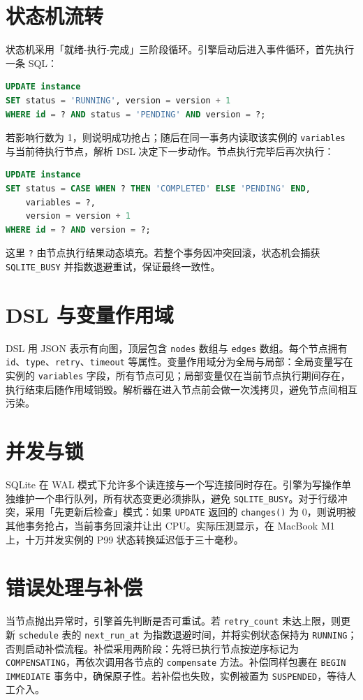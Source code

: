 \chapter{状态机流转}
状态机采用「就绪-执行-完成」三阶段循环。引擎启动后进入事件循环，首先执行一条 SQL：\par
\begin{lstlisting}[language=sql]
UPDATE instance
SET status = 'RUNNING', version = version + 1
WHERE id = ? AND status = 'PENDING' AND version = ?;
\end{lstlisting}
若影响行数为 1，则说明成功抢占；随后在同一事务内读取该实例的 \texttt{variables} 与当前待执行节点，解析 DSL 决定下一步动作。节点执行完毕后再次执行：\par
\begin{lstlisting}[language=sql]
UPDATE instance
SET status = CASE WHEN ? THEN 'COMPLETED' ELSE 'PENDING' END,
    variables = ?,
    version = version + 1
WHERE id = ? AND version = ?;
\end{lstlisting}
这里 \texttt{?} 由节点执行结果动态填充。若整个事务因冲突回滚，状态机会捕获 \texttt{SQLITE\_{}BUSY} 并指数退避重试，保证最终一致性。\par
\chapter{DSL 与变量作用域}
DSL 用 JSON 表示有向图，顶层包含 \texttt{nodes} 数组与 \texttt{edges} 数组。每个节点拥有 \texttt{id}、\texttt{type}、\texttt{retry}、\texttt{timeout} 等属性。变量作用域分为全局与局部：全局变量写在实例的 \texttt{variables} 字段，所有节点可见；局部变量仅在当前节点执行期间存在，执行结束后随作用域销毁。解析器在进入节点前会做一次浅拷贝，避免节点间相互污染。\par
\chapter{并发与锁}
SQLite 在 WAL 模式下允许多个读连接与一个写连接同时存在。引擎为写操作单独维护一个串行队列，所有状态变更必须排队，避免 \texttt{SQLITE\_{}BUSY}。对于行级冲突，采用「先更新后检查」模式：如果 \texttt{UPDATE} 返回的 \texttt{changes()} 为 0，则说明被其他事务抢占，当前事务回滚并让出 CPU。实际压测显示，在 MacBook M1 上，十万并发实例的 P99 状态转换延迟低于三十毫秒。\par
\chapter{错误处理与补偿}
当节点抛出异常时，引擎首先判断是否可重试。若 \texttt{retry\_{}count} 未达上限，则更新 \texttt{schedule} 表的 \texttt{next\_{}run\_{}at} 为指数退避时间，并将实例状态保持为 \texttt{RUNNING}；否则启动补偿流程。补偿采用两阶段：先将已执行节点按逆序标记为 \texttt{COMPENSATING}，再依次调用各节点的 \texttt{compensate} 方法。补偿同样包裹在 \texttt{BEGIN IMMEDIATE} 事务中，确保原子性。若补偿也失败，实例被置为 \texttt{SUSPENDED}，等待人工介入。\par
